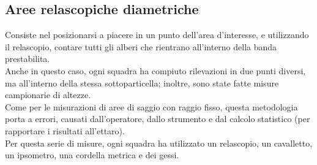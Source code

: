 \subsection{Aree relascopiche diametriche}
Consiste nel posizionarsi a piacere in un punto dell'area d'interesse, e utilizzando il relascopio, contare tutti gli alberi che rientrano all'interno della banda prestabilita.\\
Anche in questo caso, ogni squadra ha compiuto rilevazioni in due punti diversi, ma all'interno della stessa sottoparticella; inoltre, sono state fatte misure campionarie di altezze.\\
Come per le misurazioni di aree di saggio con raggio fisso, questa metodologia porta a errori, causati dall'operatore, dallo strumento e dal calcolo statistico (per rapportare i risultati all'ettaro).\\
Per questa serie di misure, ogni squadra ha utilizzato un relascopio, un cavalletto, un ipsometro, una cordella metrica e dei gessi.